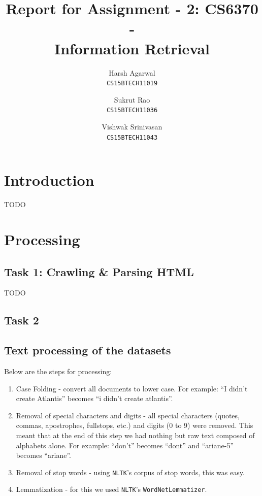 \documentclass{article}
\title{Report for Assignment - 2: CS6370 - \\Information Retrieval}
\author{
Harsh Agarwal\\\texttt{CS15BTECH11019}
\and
Sukrut Rao\\\texttt{CS15BTECH11036}
\and
Vishwak Srinivasan\\\texttt{CS15BTECH11043}
}
\date{}
\begin{document}
\maketitle

\section{Introduction}
\begin{flushleft}
	TODO
\end{flushleft}

\section{Processing}
\subsection{Task 1: Crawling \& Parsing HTML}
\begin{flushleft}
	TODO
\end{flushleft}
\newpage

\subsection{Task 2}
\subsection{Text processing of the datasets}
\begin{flushleft}
	Below are the steps for processing:
	\begin{enumerate}
		\item Case Folding - convert all documents to lower case. For example: ``I didn't create Atlantis'' becomes ``i didn't create atlantis''.
		\item Removal of special characters and digits - all special characters (quotes, commas, apostrophes, fullstops, etc.) and digits (0 to 9) were removed. This meant that at the end of this step we had nothing but raw text composed of alphabets alone. For example: ``don't'' becomes ``dont'' and ``ariane-5'' becomes ``ariane''.
		\item Removal of stop words - using \texttt{NLTK}'s corpus of stop words, this was easy.
		\item Lemmatization - for this we used \texttt{NLTK}'s \texttt{WordNetLemmatizer}.
	\end{enumerate}
\end{flushleft}
\end{document}

